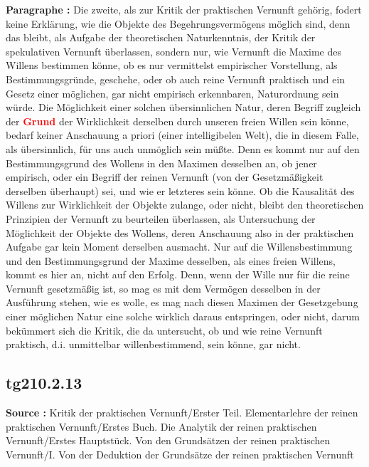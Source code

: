\documentclass[a4paper,12pt,twoside]{book}
\newcommand{\match}[1]{\textcolor{red}{\textbf{#1}}}
\begin{document}
	\noindent\textbf{Paragraphe : }Die zweite, als zur Kritik der praktischen Vernunft gehörig, fodert keine Erklärung, wie die Objekte des Begehrungsvermögens möglich sind, denn das bleibt, als Aufgabe der theoretischen Naturkenntnis, der Kritik der spekulativen Vernunft überlassen, sondern nur, wie Vernunft die Maxime des Willens bestimmen könne, ob es nur vermittelst empirischer Vorstellung, als Bestimmungsgründe, geschehe, oder ob auch reine Vernunft praktisch und ein Gesetz einer möglichen, gar nicht empirisch erkennbaren, Naturordnung sein würde. Die Möglichkeit einer solchen übersinnlichen Natur, deren Begriff zugleich der \match{Grund} der Wirklichkeit derselben durch unseren freien Willen sein könne, bedarf keiner Anschauung a priori (einer intelligibelen Welt), die in diesem Falle, als übersinnlich, für uns auch unmöglich sein müßte. Denn es kommt nur auf den Bestimmungsgrund des Wollens in den Maximen desselben an, ob jener empirisch, oder ein Begriff der reinen Vernunft (von der Gesetzmäßigkeit derselben überhaupt) sei, und wie er letzteres sein könne. Ob die Kausalität des Willens zur Wirklichkeit der Objekte zulange, oder nicht, bleibt den theoretischen Prinzipien der Vernunft zu beurteilen überlassen, als Untersuchung der Möglichkeit der Objekte des Wollens, deren Anschauung also in der praktischen Aufgabe gar kein Moment derselben ausmacht. Nur auf die Willensbestimmung und den Bestimmungsgrund der Maxime desselben, als eines freien Willens, kommt es hier an, nicht auf den Erfolg. Denn,  wenn der Wille nur für die reine Vernunft gesetzmäßig ist, so mag es mit dem Vermögen desselben in der Ausführung stehen, wie es wolle, es mag nach diesen Maximen der Gesetzgebung einer möglichen Natur eine solche wirklich daraus entspringen, oder nicht, darum bekümmert sich die Kritik, die da untersucht, ob und wie reine Vernunft praktisch, d.i. unmittelbar willenbestimmend, sein könne, gar nicht. 
	
	\subsection*{tg210.2.13} 
	\textbf{Source : }Kritik der praktischen Vernunft/Erster Teil. Elementarlehre der reinen praktischen Vernunft/Erstes Buch. Die Analytik der reinen praktischen Vernunft/Erstes Hauptstück. Von den Grundsätzen der reinen praktischen Vernunft/I. Von der Deduktion der Grundsätze der reinen praktischen Vernunft\\  
	
\end{document}
